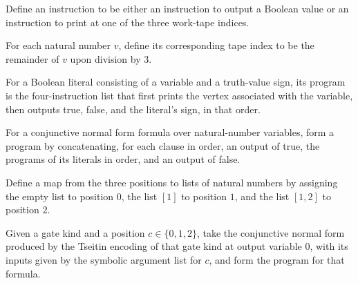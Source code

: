 \begin{definition}
\label{BoolCircuit.CktSatReduction.Emitter.Instr}
\leanok
Define an instruction to be either an instruction to output a Boolean value or an
instruction to print at one of the three work-tape indices.
\end{definition}

\begin{definition}
\label{BoolCircuit.CktSatReduction.Emitter.vtx}
\leanok
For each natural number $v$, define its corresponding tape index to be the remainder of
$v$ upon division by $3$.
\end{definition}

\begin{definition}
\label{BoolCircuit.CktSatReduction.Emitter.litProg}
\leanok
{}
For a Boolean literal consisting of a variable and a truth-value sign, its program is
the four-instruction list that first prints the vertex associated with the variable,
then outputs true, false, and the literal’s sign, in that order.
\end{definition}

\begin{definition}
\label{BoolCircuit.CktSatReduction.Emitter.progOf}
\leanok
{}
For a conjunctive normal form formula over natural-number variables, form a program by
concatenating, for each clause in order, an output of true, the programs of its literals
in order, and an output of false.
\end{definition}

\begin{definition}
\label{BoolCircuit.CktSatReduction.Emitter.argsSym}
\leanok
Define a map from the three positions to lists of natural numbers by assigning the empty
list to position $0$, the list $[1]$ to position $1$, and the list $[1,2]$ to position
$2$.
\end{definition}

\begin{definition}
\label{BoolCircuit.CktSatReduction.Emitter.prog}
\leanok
{}
Given a gate kind and a position $c\in\{0,1,2\}$, take the conjunctive normal form
produced by the Tseitin encoding of that gate kind at output variable $0$, with its
inputs given by the symbolic argument list for $c$, and form the program for that
formula.
\end{definition}

